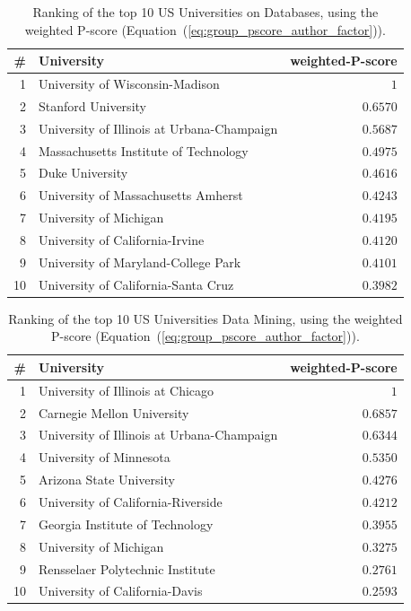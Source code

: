 \documentclass[msc]{ppgccufmg}
\begin{document}
\begin{table}[htbp]
\centering
\caption{Ranking of the top 10 US Universities on Databases, using the weighted P-score (Equation~(\ref{eq:group_pscore_author_factor})).}
\label{tab:top10-db}
\begin{tabular}{rlr}
	\toprule
	\# & University                                 & \multicolumn{1}{c}{weighted-P-score} \\
	\midrule
	1	& University of Wisconsin-Madison				& $1$	    \\
	2	& Stanford University							& $0.6570$	\\
	3	& University of Illinois at Urbana-Champaign	& $0.5687$	\\
	4	& Massachusetts Institute of Technology			& $0.4975$	\\
	5	& Duke University								& $0.4616$	\\
	6	& University of Massachusetts Amherst			& $0.4243$	\\
	7	& University of Michigan						& $0.4195$	\\
	8	& University of California-Irvine				& $0.4120$	\\
	9	& University of Maryland-College Park			& $0.4101$	\\
	10	& University of California-Santa Cruz			& $0.3982$	\\
	\bottomrule
\end{tabular}
\end{table}

\begin{table}[htbp]
\centering
\caption{Ranking of the top 10 US Universities Data Mining, using the weighted P-score (Equation~(\ref{eq:group_pscore_author_factor})).}
\label{tab:top10-dm}
\begin{tabular}{rlr}
	\toprule
	\# & University                                 & \multicolumn{1}{c}{weighted-P-score} \\
	\midrule
	1	& University of Illinois at Chicago				& $1$	    \\
	2	& Carnegie Mellon University					& $0.6857$	\\
	3	& University of Illinois at Urbana-Champaign	& $0.6344$	\\
	4	& University of Minnesota						& $0.5350$	\\
	5	& Arizona State University						& $0.4276$	\\
	6	& University of California-Riverside			& $0.4212$	\\
	7	& Georgia Institute of Technology				& $0.3955$	\\
	8	& University of Michigan						& $0.3275$	\\
	9	& Rensselaer Polytechnic Institute				& $0.2761$	\\
	10	& University of California-Davis				& $0.2593$	\\
	\bottomrule
\end{tabular}
\end{table}
\end{document}
